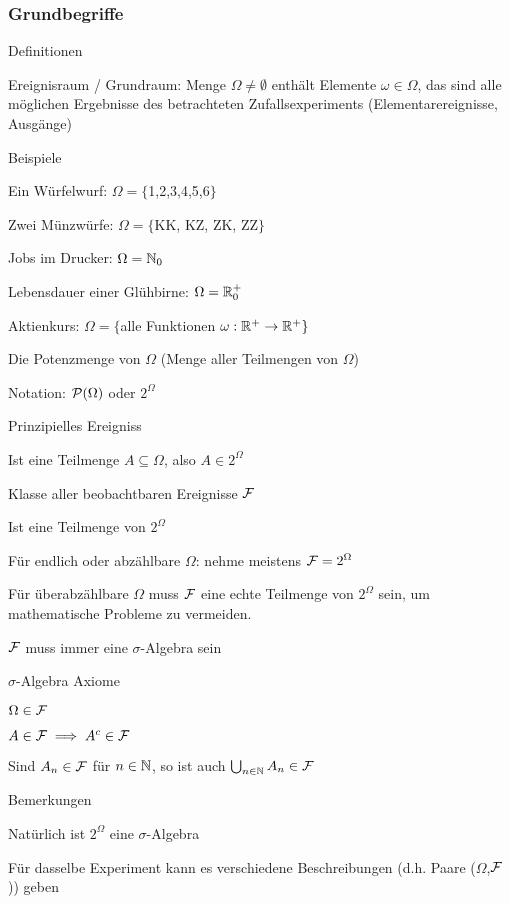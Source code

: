 \subsubsection{Grundbegriffe}
Definitionen\\
\enumstart
	\item Ereignisraum / Grundraum: Menge $\Omega \neq \emptyset$ enthält Elemente $\omega \in \Omega$, das sind alle möglichen Ergebnisse des betrachteten Zufallsexperiments (Elementarereignisse, Ausgänge)
	\item Beispiele
	\enumstart
		\item Ein Würfelwurf: $\Omega = \{$1,2,3,4,5,6$\}$
		\item Zwei Münzwürfe: $\Omega = \{$KK, KZ, ZK, ZZ$\}$
		\item Jobs im Drucker: $\Omega = \mathbb{N}_0$
		\item Lebensdauer einer Glühbirne: $\Omega = \mathbb{R}^{+}_0$
		\item Aktienkurs: $\Omega = \{$alle Funktionen $\omega:\mathbb{R}^{+} \rightarrow \mathbb{R}^{+}\}$
	\enumend
	\item Die Potenzmenge von $\Omega$ (Menge aller Teilmengen von $\Omega$)
	\enumstart
		\item Notation: $\mathcal{P}(\Omega)$ oder $2^{\Omega}$
	\enumend
	\item Prinzipielles Ereigniss
	\enumstart
		\item Ist eine Teilmenge $A \subseteq \Omega$, also $A \in 2^{\Omega}$
	\enumend
	\item Klasse aller beobachtbaren Ereignisse $\mathcal{F}$
	\enumstart
		\item Ist eine Teilmenge von $2^{\Omega}$
		\item Für endlich oder abzählbare $\Omega$: nehme meistens $\mathcal{F} = 2^{\Omega}$
		\item Für überabzählbare $\Omega$ muss $\mathcal{F}$ eine echte Teilmenge von $2^{\Omega}$ sein, um mathematische Probleme zu vermeiden.
		\item $\mathcal{F}$ muss immer eine $\sigma$-Algebra sein
	\enumend
	\item $\sigma$-Algebra Axiome
	\enumstart
		\item $\Omega \in \mathcal{F}$
		\item $A \in \mathcal{F} \implies A^c \in \mathcal{F}$
		\item Sind $A_n \in \mathcal{F}$ für $n \in \mathbb{N}$, so ist auch $\bigcup_{n \in \mathbb{N}}A_n \in \mathcal{F}$
	\enumend
	\item Bemerkungen
	\enumstart
		\item Natürlich ist $2^{\Omega}$ eine $\sigma$-Algebra
		\item Für dasselbe Experiment kann es verschiedene Beschreibungen (d.h. Paare ($\Omega$,$\mathcal{F}$)) geben
	\enumend
\enumend

